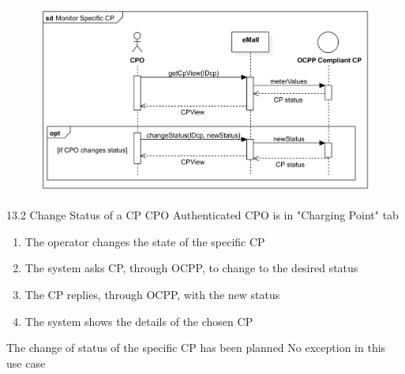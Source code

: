 \usecase
{
    \begin{figure}[H]
        \centering
        \includegraphics[scale=0.9]{src/sequence_diagram/monitorSpecificCP.png}
    \end{figure}
}
{13.2}
{Change Status of a CP} %
{CPO} %
{Authenticated CPO is in "Charging Point" tab} %
{ %
    \begin{enumerate}
        \item The operator changes the state of the specific CP
        \item The system asks CP, through OCPP, to change to the desired status
        \item The CP replies, through OCPP, with the new status
        \item The system shows the details of the chosen CP
    \end{enumerate}
}
{The change of status of the specific CP has been planned} %
{ %
    No exception in this use case
}
{ %
}

